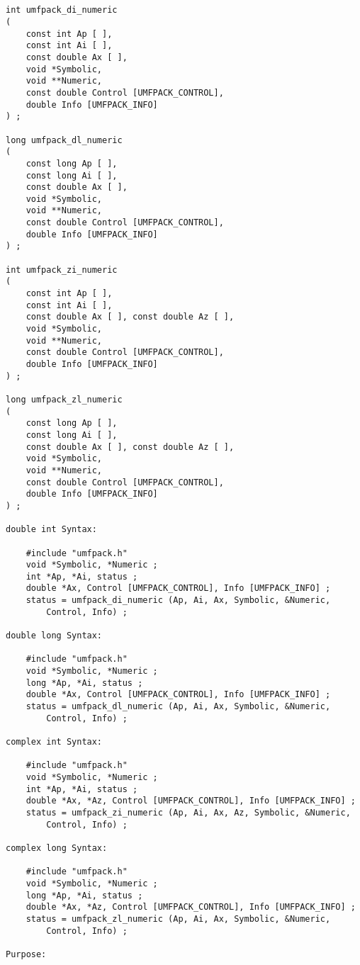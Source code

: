 {\footnotesize
\begin{verbatim}


int umfpack_di_numeric
(
    const int Ap [ ],
    const int Ai [ ],
    const double Ax [ ],
    void *Symbolic,
    void **Numeric,
    const double Control [UMFPACK_CONTROL],
    double Info [UMFPACK_INFO]
) ;

long umfpack_dl_numeric
(
    const long Ap [ ],
    const long Ai [ ],
    const double Ax [ ],
    void *Symbolic,
    void **Numeric,
    const double Control [UMFPACK_CONTROL],
    double Info [UMFPACK_INFO]
) ;

int umfpack_zi_numeric
(
    const int Ap [ ],
    const int Ai [ ],
    const double Ax [ ], const double Az [ ],
    void *Symbolic,
    void **Numeric,
    const double Control [UMFPACK_CONTROL],
    double Info [UMFPACK_INFO]
) ;

long umfpack_zl_numeric
(
    const long Ap [ ],
    const long Ai [ ],
    const double Ax [ ], const double Az [ ],
    void *Symbolic,
    void **Numeric,
    const double Control [UMFPACK_CONTROL],
    double Info [UMFPACK_INFO]
) ;

double int Syntax:

    #include "umfpack.h"
    void *Symbolic, *Numeric ;
    int *Ap, *Ai, status ;
    double *Ax, Control [UMFPACK_CONTROL], Info [UMFPACK_INFO] ;
    status = umfpack_di_numeric (Ap, Ai, Ax, Symbolic, &Numeric,
        Control, Info) ;

double long Syntax:

    #include "umfpack.h"
    void *Symbolic, *Numeric ;
    long *Ap, *Ai, status ;
    double *Ax, Control [UMFPACK_CONTROL], Info [UMFPACK_INFO] ;
    status = umfpack_dl_numeric (Ap, Ai, Ax, Symbolic, &Numeric,
        Control, Info) ;

complex int Syntax:

    #include "umfpack.h"
    void *Symbolic, *Numeric ;
    int *Ap, *Ai, status ;
    double *Ax, *Az, Control [UMFPACK_CONTROL], Info [UMFPACK_INFO] ;
    status = umfpack_zi_numeric (Ap, Ai, Ax, Az, Symbolic, &Numeric,
        Control, Info) ;

complex long Syntax:

    #include "umfpack.h"
    void *Symbolic, *Numeric ;
    long *Ap, *Ai, status ;
    double *Ax, *Az, Control [UMFPACK_CONTROL], Info [UMFPACK_INFO] ;
    status = umfpack_zl_numeric (Ap, Ai, Ax, Symbolic, &Numeric,
        Control, Info) ;

Purpose:


\end{verbatim}}
